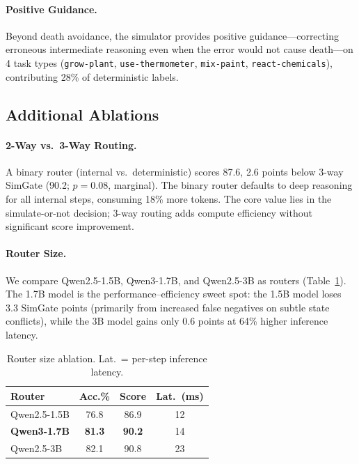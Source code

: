 \documentclass[11pt,a4paper]{article}
\begin{document}
\paragraph{Positive Guidance.}
Beyond death avoidance, the simulator provides positive guidance---correcting erroneous intermediate reasoning even when the error would not cause death---on 4 task types (\texttt{grow-plant}, \texttt{use-thermometer}, \texttt{mix-paint}, \texttt{react-chemicals}), contributing 28\% of deterministic labels.

\subsection{Additional Ablations}

\paragraph{2-Way vs.\ 3-Way Routing.}
A binary router (internal vs.\ deterministic) scores 87.6, 2.6 points below 3-way SimGate (90.2; $p{=}0.08$, marginal).
The binary router defaults to deep reasoning for all internal steps, consuming 18\% more tokens.
The core value lies in the simulate-or-not decision; 3-way routing adds compute efficiency without significant score improvement.

\paragraph{Router Size.}
We compare Qwen2.5-1.5B, Qwen3-1.7B, and Qwen2.5-3B as routers (Table~\ref{tab:router_size}).
The 1.7B model is the performance--efficiency sweet spot: the 1.5B model loses 3.3 SimGate points (primarily from increased false negatives on subtle state conflicts), while the 3B model gains only 0.6 points at 64\% higher inference latency.

\begin{table}[t]
\centering
\small
\begin{tabular}{lccc}
\toprule
\textbf{Router} & \textbf{Acc.\%} & \textbf{Score} & \textbf{Lat.\ (ms)} \\
\midrule
Qwen2.5-1.5B & 76.8 & 86.9 & 12 \\
\textbf{Qwen3-1.7B} & \textbf{81.3} & \textbf{90.2} & 14 \\
Qwen2.5-3B & 82.1 & 90.8 & 23 \\
\bottomrule
\end{tabular}
\caption{Router size ablation. Lat.\ = per-step inference latency.}
\label{tab:router_size}
\end{table}
\end{document}
